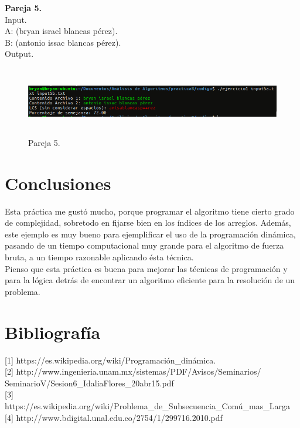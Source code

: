 \documentclass[12pt]{report}
\begin{document}
	\textbf{Pareja 5.}\\
	Input.\\
	A: (bryan israel blancas pérez).\\
	B: (antonio issac blancas pérez).\\	
	Output.\\	
	\begin{figure}[H]
		\includegraphics[height=3cm,width=15cm]{imagenes/7.png}
		\centering
		\caption{Pareja 5.}
		\centering
	\end{figure}

\newpage		
\section{Conclusiones}
Esta práctica me gustó mucho, porque programar el algoritmo tiene cierto grado de complejidad, sobretodo en fijarse bien en los índices de los arreglos. Además, este ejemplo es muy bueno para ejemplificar el uso de la programación dinámica, pasando de un tiempo computacional muy grande para el algoritmo de fuerza bruta, a un tiempo razonable aplicando ésta técnica.\\
Pienso que esta práctica es buena para mejorar las técnicas de programación y para la lógica detrás de encontrar un algoritmo eficiente para la resolución de un problema.
\newpage 

\section{Bibliografía}

[1] https://es.wikipedia.org/wiki/Programación\_dinámica.\\

[2] http://www.ingenieria.unam.mx/sistemas/PDF/Avisos/Seminarios/\\SeminarioV/Sesion6\_IdaliaFlores\_20abr15.pdf\\

[3] https://es.wikipedia.org/wiki/Problema\_de\_Subsecuencia\_Comú\_mas\_Larga\\

[4] http://www.bdigital.unal.edu.co/2754/1/299716.2010.pdf
	
		
\end{document}
